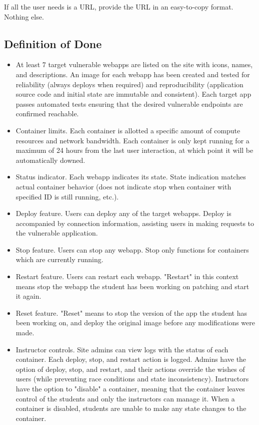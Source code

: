 \documentclass[12pt]{article}
\begin{document}
If all the user needs is a URL, provide the URL in an easy-to-copy format. Nothing else.

\subsection{Definition of Done}
\begin{itemize}
	\item At least 7 target vulnerable webapps are listed on the site with icons, names, and descriptions. An image for each webapp has been created and tested for reliability (always deploys when required) and reproducibility (application source code and initial state are immutable and consistent). Each target app passes automated tests ensuring that the desired vulnerable endpoints are confirmed reachable.
	\item Container limits. Each container is allotted a specific amount of compute resources and network bandwidth. Each container is only kept running for a maximum of 24 hours from the last user interaction, at which point it will be automatically downed.
	\item Status indicator. Each webapp indicates its state. State indication matches actual container behavior (does not indicate stop when container with specified ID is still running, etc.).
	\item Deploy feature. Users can deploy any of the target webapps. Deploy is accompanied by connection information, assisting users in making requests to the vulnerable application.
	\item Stop feature. Users can stop any webapp. Stop only functions for containers which are currently running.
	\item Restart feature. Users can restart each webapp. "Restart" in this context means stop the webapp the student has been working on patching and start it again.
	\item Reset feature. "Reset" means to stop the version of the app the student has been working on, and deploy the original image before any modifications were made.
	\item Instructor controls. Site admins can view logs with the status of each container. Each deploy, stop, and restart action is logged. Admins have the option of deploy, stop, and restart, and their actions override the wishes of users (while preventing race conditions and state inconsistency). Instructors have the option to "disable" a container, meaning that the container leaves control of the students and only the instructors can manage it. When a container is disabled, students are unable to make any state changes to the container.

\end{itemize}
\end{document}
